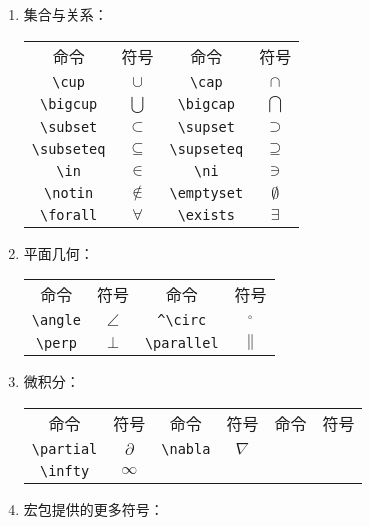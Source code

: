 \begin{multicols}{2}
\begin{enumerate}
\item 集合与关系：

\begin{center}
\begin{tabular}{cccc}
命令 & 符号 & 命令 & 符号 \\
\verb|\cup| & $\cup$ & \verb|\cap| & $\cap$ \\ 
\verb|\bigcup| & $\bigcup$ & \verb|\bigcap| & $\bigcap$ \\ 
\verb|\subset| & $\subset$ & \verb|\supset| & $\supset$ \\ 
\verb|\subseteq| & $\subseteq$ & \verb|\supseteq| & $\supseteq$ \\ 
\verb|\in| & $\in$ & \verb|\ni| & $\ni$ \\ 
\verb|\notin| & $\notin$ & \verb|\emptyset| & $\emptyset$ \\ 
\verb|\forall| & $\forall$ & \verb|\exists| & $\exists$ \\
\end{tabular}
\end{center}

\item 平面几何：

\begin{center}
\begin{tabular}{cccc}
命令 & 符号 & 命令 & 符号 \\
\verb|\angle| & $\angle$ & \verb|^\circ| & $^\circ$ \\ 
\verb|\perp| & $\perp$ & \verb|\parallel| & $\parallel$ \\ 
\end{tabular}
\end{center}

\item 微积分：

\begin{center}
\begin{tabular}{cccc|cc}
命令 & 符号 & 命令 & 符号 & 命令 & 符号\\
\verb|\partial| & $\partial$ & \verb|\nabla| & $\nabla$ \\
\verb|\infty| & $\infty$ & & \\ 
\end{tabular}
\end{center}

\item {} 宏包提供的更多符号：


\end{enumerate}
\end{multicols}
